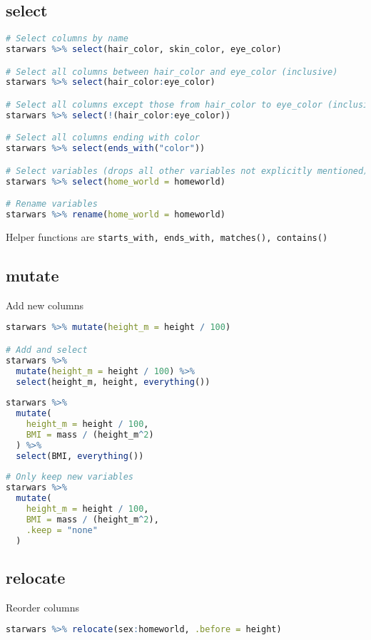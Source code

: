 \documentclass[11pt]{article}
\begin{document}
\subsection{select}

\begin{lstlisting}[language=R]
# Select columns by name
starwars %>% select(hair_color, skin_color, eye_color)

# Select all columns between hair_color and eye_color (inclusive)
starwars %>% select(hair_color:eye_color)

# Select all columns except those from hair_color to eye_color (inclusive)
starwars %>% select(!(hair_color:eye_color))

# Select all columns ending with color
starwars %>% select(ends_with("color"))

# Select variables (drops all other variables not explicitly mentioned)
starwars %>% select(home_world = homeworld)

# Rename variables
starwars %>% rename(home_world = homeworld)

\end{lstlisting}

Helper functions are \lstinline|starts_with, ends_with, matches(), contains()|

\subsection{mutate}

Add new columns

\begin{lstlisting}[language=R]
starwars %>% mutate(height_m = height / 100)

# Add and select
starwars %>%
  mutate(height_m = height / 100) %>%
  select(height_m, height, everything())
  
starwars %>%
  mutate(
    height_m = height / 100,
    BMI = mass / (height_m^2)
  ) %>%
  select(BMI, everything())
  
# Only keep new variables
starwars %>%
  mutate(
    height_m = height / 100,
    BMI = mass / (height_m^2),
    .keep = "none"
  )
\end{lstlisting}

\subsection{relocate}

Reorder columns

\begin{lstlisting}[language=R]
starwars %>% relocate(sex:homeworld, .before = height)
\end{lstlisting}
\end{document}
